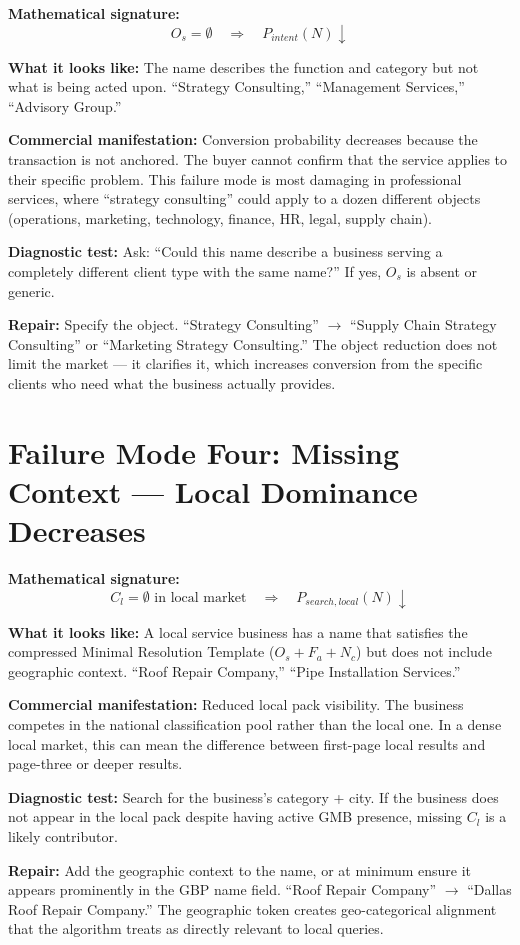 \documentclass[12pt, openany]{book}
\theoremstyle{thmstyle}
\theoremstyle{defstyle}
\begin{document}
\begin{failbox}
\textbf{Mathematical signature:}
\[
O_s = \emptyset \quad \Rightarrow \quad P_{intent}(N) \downarrow
\]

\textbf{What it looks like:} The name describes the function and category but not what is being acted upon. ``Strategy Consulting,'' ``Management Services,'' ``Advisory Group.''

\textbf{Commercial manifestation:} Conversion probability decreases because the transaction is not anchored. The buyer cannot confirm that the service applies to their specific problem. This failure mode is most damaging in professional services, where ``strategy consulting'' could apply to a dozen different objects (operations, marketing, technology, finance, HR, legal, supply chain).

\textbf{Diagnostic test:} Ask: ``Could this name describe a business serving a completely different client type with the same name?'' If yes, $O_s$ is absent or generic.

\textbf{Repair:} Specify the object. ``Strategy Consulting'' $\to$ ``Supply Chain Strategy Consulting'' or ``Marketing Strategy Consulting.'' The object reduction does not limit the market --- it clarifies it, which increases conversion from the specific clients who need what the business actually provides.
\end{failbox}

\section{Failure Mode Four: Missing Context --- Local Dominance Decreases}

\begin{failbox}
\textbf{Mathematical signature:}
\[
C_l = \emptyset \text{ in local market} \quad \Rightarrow \quad P_{search,local}(N) \downarrow
\]

\textbf{What it looks like:} A local service business has a name that satisfies the compressed Minimal Resolution Template ($O_s + F_a + N_c$) but does not include geographic context. ``Roof Repair Company,'' ``Pipe Installation Services.''

\textbf{Commercial manifestation:} Reduced local pack visibility. The business competes in the national classification pool rather than the local one. In a dense local market, this can mean the difference between first-page local results and page-three or deeper results.

\textbf{Diagnostic test:} Search for the business's category + city. If the business does not appear in the local pack despite having active GMB presence, missing $C_l$ is a likely contributor.

\textbf{Repair:} Add the geographic context to the name, or at minimum ensure it appears prominently in the GBP name field. ``Roof Repair Company'' $\to$ ``Dallas Roof Repair Company.'' The geographic token creates geo-categorical alignment that the algorithm treats as directly relevant to local queries.
\end{failbox}
\end{document}
